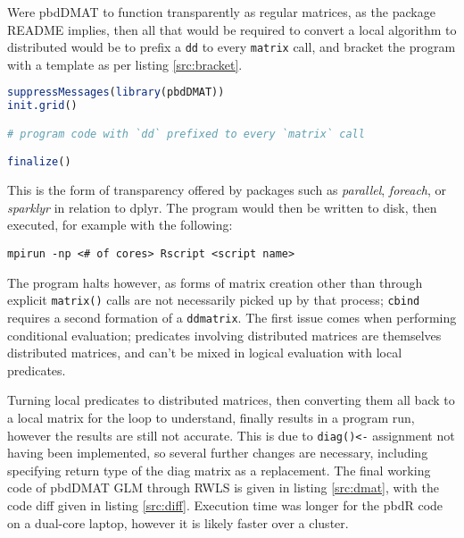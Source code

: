 \documentclass[a4paper]{article}
\begin{document}
Were pbdDMAT to function transparently as regular matrices, as the package
README implies, then all that would be required to convert a local algorithm to
distributed would be to prefix a \texttt{dd} to every \texttt{matrix} call, and
bracket the program with a template as per listing \ref{src:bracket}.
\begin{lstlisting}[float, language=R, frame=L,
caption={Idealised Common Wrap for Local to Distributed Matrices},
label=src:bracket]
suppressMessages(library(pbdDMAT))
init.grid()

# program code with `dd` prefixed to every `matrix` call

finalize()
\end{lstlisting}
This is the form of transparency offered by packages such as \textit{parallel},
\textit{foreach}, or \textit{sparklyr} in relation to dplyr.
The program would then be written to disk, then executed, for example with the
following:
\begin{lstlisting}
mpirun -np <# of cores> Rscript <script name>
\end{lstlisting}
The program halts however, as forms of matrix creation other than through
explicit \texttt{matrix()} calls are not necessarily picked up by that process;
\texttt{cbind} requires a second formation of a \texttt{ddmatrix}. The first
issue comes when performing conditional evaluation;
predicates involving distributed matrices are themselves distributed matrices,
and can't be mixed in logical evaluation with local predicates.

Turning local predicates to distributed matrices, then converting them all back
to a local matrix for the loop to understand, finally results in a program run,
however the results are still not accurate.  This is due to \texttt{diag()<-}
assignment not having been implemented, so several further changes are
necessary, including specifying return type of the diag matrix as a replacement.
The final working code of pbdDMAT GLM through RWLS is given in listing
\ref{src:dmat}, with the code diff given in listing \ref{src:diff}.
Execution time was longer for the pbdR code on a dual-core laptop, however it
is likely faster over a cluster. %




\end{document}
